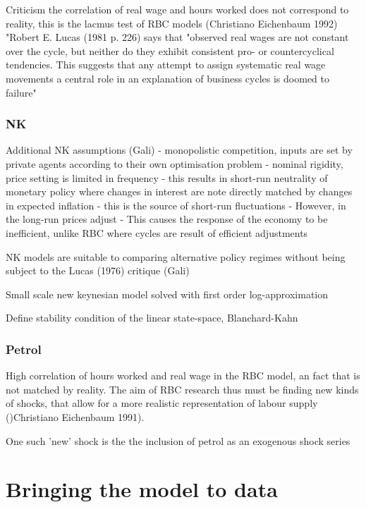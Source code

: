 \documentclass[11pt,a4paper,english]{article} %
\begin{document}
	Criticism
	the correlation of real wage and hours worked does not correspond to reality, this is the lacmus test of RBC models (Christiano Eichenbaum 1992)
	"Robert E. Lucas (1981 p. 226) says that "observed real wages are not constant over the cycle, but neither do they exhibit consistent pro- or countercyclical tendencies. This suggests that any attempt to assign systematic real wage movements a central role in an explanation of business cycles is doomed to failure" \cite{christiano_current_1992}
	
	
	\section{NK}
	
	Additional NK assumptions (Gali)
	- monopolistic competition, inputs are set by private agents according to their own optimisation problem
	- nominal rigidity, price setting is limited in frequency
		- this results in short-run neutrality of monetary policy where changes in interest are note directly matched by changes in expected inflation
		- this is the source of short-run fluctuations
		- However, in the long-run prices adjust 
	- This causes the response of the economy to be inefficient, unlike RBC where cycles are result of efficient adjustments
	
	NK models are suitable to comparing alternative policy regimes without being subject to the Lucas (1976) critique (Gali)
	
	Small scale new keynesian model solved with first order log-approximation \cite{herbst_bayesian_2014}
	
	Define stability condition of the linear state-space, Blanchard-Kahn
	
	
	\section{Petrol}
	High correlation of hours worked and real wage in the RBC model, an fact that is not matched by reality. The aim of RBC research thus must be finding new kinds of shocks, that allow for a more realistic representation of labour supply ()Christiano Eichenbaum 1991).
	
	
	One such 'new' shock is the the inclusion of petrol as an exogenous shock series \cite{kim_role_1992}
	
	
	
	
	\part{Bringing the model to data}
	
\end{document}
